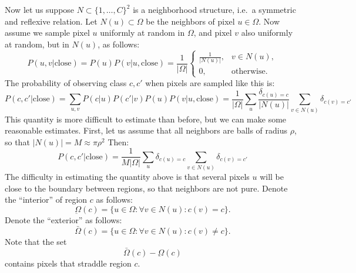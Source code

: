 Now let us suppose $N \subset \{1,\dots,C\}^2$ is a neighborhood structure, i.e.\ a symmetric and reflexive relation. Let $N(u)\subset \Omega$ be the neighbors of pixel $u \in \Omega$. Now assume we sample pixel $u$ uniformly at random in $\Omega$, and pixel $v$ also uniformly at random, but in $N(u)$, as follows:
$$
P(u,v|\text{close})
= P(u)P(v|u,\text{close})
=
\frac{1}{|\Omega|}
\begin{cases}
\frac{1}{|N(u)|}, & v \in N(u), \\
0, &\text{otherwise}.
\end{cases}
$$
The probability of observing class $c,c'$ when pixels are sampled like this is:
$$
P(c,c'|\text{close})
=
\sum_{u,v}
P(c|u) P(c'|v) P(u)P(v|u,\text{close})
=
\frac{1}{|\Omega|}
\sum_u
\frac{\delta_{c(u)=c}}{|N(u)|}
\sum_{v\in N(u)}
\delta_{c(v)=c'}
$$
This quantity is more difficult to estimate than before, but we can make some reasonable estimates. First, let us assume that all neighbors are balls of radius $\rho$, so that $|N(u)|=M\approx \pi\rho^2$ Then:
$$
P(c,c'|\text{close})
=
\frac{1}{M|\Omega|}
\sum_u
\delta_{c(u)=c}
\sum_{v\in N(u)}
\delta_{c(v)=c'}
$$
The difficulty in estimating the quantity above is that several pixels $u$ will be close to the boundary between regions, so that neighbors are not pure. Denote the ``interior'' of region $c$ as follows:
$$
 \underbar{\Omega}(c) =
 \{ 
 u \in \Omega : \forall v \in N(u) : c(v) = c
 \}.
$$
Denote the ``exterior'' as follows:
$$
 \bar{\Omega}(c) =
 \{ 
 u \in \Omega : \forall v \in N(u) : 
 c(v) \not= c
 \}.
$$
Note that the set
$$
	\bar \Omega(c) - \underbar \Omega(c)
$$
contains pixels that straddle region $c$.

